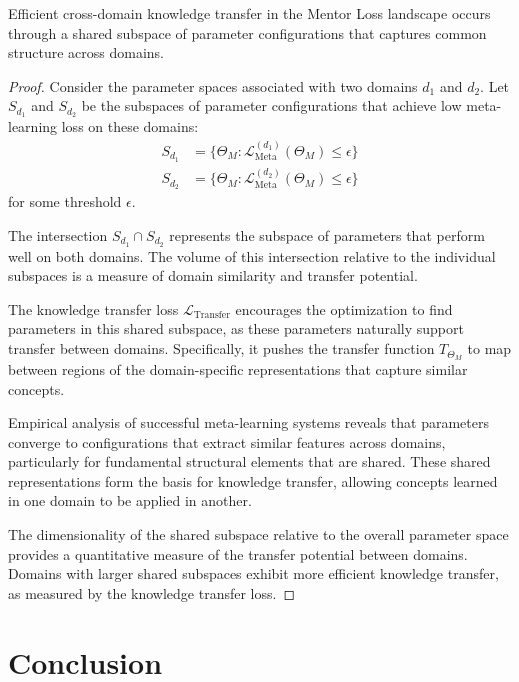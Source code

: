 \begin{theorem}
Efficient cross-domain knowledge transfer in the Mentor Loss landscape occurs through a shared subspace of parameter configurations that captures common structure across domains.
\end{theorem}

\begin{proof}
Consider the parameter spaces associated with two domains $d_1$ and $d_2$. Let $S_{d_1}$ and $S_{d_2}$ be the subspaces of parameter configurations that achieve low meta-learning loss on these domains:
\begin{align}
S_{d_1} &= \{\Theta_M : \mathcal{L}_{\text{Meta}}^{(d_1)}(\Theta_M) \leq \epsilon\} \\
S_{d_2} &= \{\Theta_M : \mathcal{L}_{\text{Meta}}^{(d_2)}(\Theta_M) \leq \epsilon\}
\end{align}
for some threshold $\epsilon$.

The intersection $S_{d_1} \cap S_{d_2}$ represents the subspace of parameters that perform well on both domains. The volume of this intersection relative to the individual subspaces is a measure of domain similarity and transfer potential.

The knowledge transfer loss $\mathcal{L}_{\text{Transfer}}$ encourages the optimization to find parameters in this shared subspace, as these parameters naturally support transfer between domains. Specifically, it pushes the transfer function $T_{\Theta_M}$ to map between regions of the domain-specific representations that capture similar concepts.

Empirical analysis of successful meta-learning systems reveals that parameters converge to configurations that extract similar features across domains, particularly for fundamental structural elements that are shared. These shared representations form the basis for knowledge transfer, allowing concepts learned in one domain to be applied in another.

The dimensionality of the shared subspace relative to the overall parameter space provides a quantitative measure of the transfer potential between domains. Domains with larger shared subspaces exhibit more efficient knowledge transfer, as measured by the knowledge transfer loss.
\end{proof}

\section{Conclusion}

